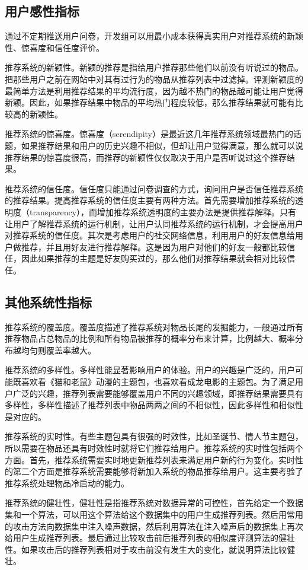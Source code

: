   \subsection{用户感性指标}
  通过不定期推送用户问卷，开发组可以用最小成本获得真实用户对推荐系统的新颖性、惊喜度和信任度评价。

  推荐系统的新颖性。新颖的推荐是指给用户推荐那些他们以前没有听说过的物品。把那些用户之前在网站中对其有过行为的物品从推荐列表中过滤掉。评测新颖度的最简单方法是利用推荐结果的平均流行度，因为越不热门的物品越可能让用户觉得新颖。因此，如果推荐结果中物品的平均热门程度较低，那么推荐结果就可能有比较高的新颖性。

  推荐系统的惊喜度。惊喜度（serendipity）是最近这几年推荐系统领域最热门的话题，如果推荐结果和用户的历史兴趣不相似，但却让用户觉得满意，那么就可以说推荐结果的惊喜度很高，而推荐的新颖性仅仅取决于用户是否听说过这个推荐结果。

  推荐系统的信任度。信任度只能通过问卷调查的方式，询问用户是否信任推荐系统的推荐结果。提高推荐系统的信任度主要有两种方法。首先需要增加推荐系统的透明度（transparency），而增加推荐系统透明度的主要办法是提供推荐解释。只有让用户了解推荐系统的运行机制，让用户认同推荐系统的运行机制，才会提高用户对推荐系统的信任度。其次是考虑用户的社交网络信息，利用用户的好友信息给用户做推荐，并且用好友进行推荐解释。这是因为用户对他们的好友一般都比较信任，因此如果推荐的主题是好友购买过的，那么他们对推荐结果就会相对比较信任。

  \subsection{其他系统性指标}
  推荐系统的覆盖度。覆盖度描述了推荐系统对物品长尾的发掘能力，一般通过所有推荐物品占总物品的比例和所有物品被推荐的概率分布来计算，比例越大、概率分布越均匀则覆盖率越大。

  推荐系统的多样性。多样性能显著影响用户的体验。用户的兴趣是广泛的，用户可能既喜欢看《猫和老鼠》动漫的主题包，也喜欢看成龙电影的主题包。为了满足用户广泛的兴趣，推荐列表需要能够覆盖用户不同的兴趣领域，即推荐结果需要具有多样性，多样性描述了推荐列表中物品两两之间的不相似性，因此多样性和相似性是对应的。

  推荐系统的实时性。有些主题包具有很强的时效性，比如圣诞节、情人节主题包，所以需要在物品还具有时效性时就将它们推荐给用户。推荐系统的实时性包括两个方面。首先，推荐系统需要实时地更新推荐列表来满足用户新的行为变化。实时性的第二个方面是推荐系统需要能够将新加入系统的物品推荐给用户。这主要考验了推荐系统处理物品冷启动的能力。

  推荐系统的健壮性，健壮性是指推荐系统对数据异常的可控性，首先给定一个数据集和一个算法，可以用这个算法给这个数据集中的用户生成推荐列表。然后用常用的攻击方法向数据集中注入噪声数据，然后利用算法在注入噪声后的数据集上再次给用户生成推荐列表。最后通过比较攻击前后推荐列表的相似度评测算法的健壮性。如果攻击后的推荐列表相对于攻击前没有发生大的变化，就说明算法比较健壮。


